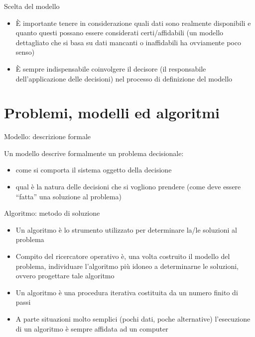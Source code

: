 \documentclass{beamer}
\begin{document}
\begin{frame}{Scelta del modello}
  \begin{itemize}
   \item \`E importante tenere in considerazione quali dati sono realmente disponibili e quanto questi possano essere considerati certi/affidabili (un modello dettagliato che si basa su dati mancanti o inaffidabili ha ovviamente poco senso)
   \item \`E sempre indispensabile coinvolgere il decisore (il responsabile dell'applicazione delle decisioni) nel processo di definizione del modello
  \end{itemize}
\end{frame}

\section{Problemi, modelli ed algoritmi}

\begin{frame}{Modello: descrizione formale}
  
  Un modello descrive formalmente un problema decisionale:

  \begin{itemize}
    \item come si comporta il sistema oggetto della decisione
  
    \item qual \`e la natura delle decisioni che si vogliono prendere (come deve essere ``fatta'' una soluzione al problema)
  \end{itemize}

\end{frame}

\begin{frame}{Algoritmo: metodo di soluzione}
\begin{itemize}
\item Un algoritmo \`e lo strumento utilizzato per determinare la/le soluzioni al problema
  
\item Compito del ricercatore operativo \`e, una volta costruito il modello del problema, individuare l’algoritmo pi\`u idoneo a determinarne le soluzioni, ovvero progettare tale algoritmo
  
\item Un algoritmo \`e una procedura iterativa costituita da un numero finito di passi
  
\item A parte situazioni molto semplici (pochi dati, poche alternative) l’esecuzione di un algoritmo \`e sempre affidata ad un computer
\end{itemize}
\end{frame}
\end{document}
